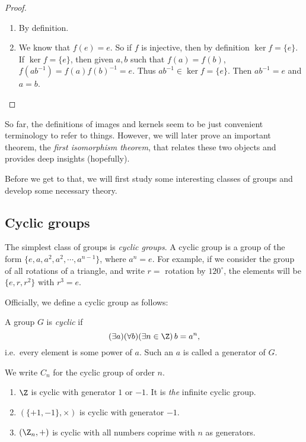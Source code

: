 \documentclass[a4paper]{article}
\begin{document}
\begin{proof}\leavevmode
  \begin{enumerate}
    \item By definition.
    \item We know that $f(e) = e$. So if $f$ is injective, then by definition $\ker f = \{e\}$. If $\ker f = \{e\}$, then given $a, b$ such that $f(a) = f(b)$, $f(ab^{-1}) = f(a)f(b)^{-1} = e$. Thus $ab^{-1}\in \ker f = \{e\}$. Then $ab^{-1} = e$ and $a = b$.\qedhere
  \end{enumerate}
\end{proof}

So far, the definitions of images and kernels seem to be just convenient terminology to refer to things. However, we will later prove an important theorem, the \emph{first isomorphism theorem}, that relates these two objects and provides deep insights (hopefully).

Before we get to that, we will first study some interesting classes of groups and develop some necessary theory.

\subsection{Cyclic groups}
The simplest class of groups is \emph{cyclic groups}. A cyclic group is a group of the form $\{e, a, a^2, a^2, \cdots, a^{n - 1}\}$, where $a^n = e$. For example, if we consider the group of all rotations of a triangle, and write $r = $ rotation by $120^\circ$, the elements will be $\{e, r, r^2\}$ with $r^3 = e$.

Officially, we define a cyclic group as follows:
\begin{defi}
  A group $G$ is \emph{cyclic} if
  \[
    (\exists a)(\forall b)(\exists n\in\Z)\, b = a^n,
  \]
  i.e.\ every element is some power of $a$. Such an $a$ is called a generator of $G$.

  We write $C_n$ for the cyclic group of order $n$.
\end{defi}

\begin{eg}\leavevmode
  \begin{enumerate}
    \item $\Z$ is cyclic with generator $1$ or $-1$. It is \emph{the} infinite cyclic group.
    \item $(\{+1, -1\}, \times)$ is cyclic with generator $-1$.
    \item $(\Z_n, +)$ is cyclic with all numbers coprime with $n$ as generators.
  \end{enumerate}
\end{eg}
\end{document}

